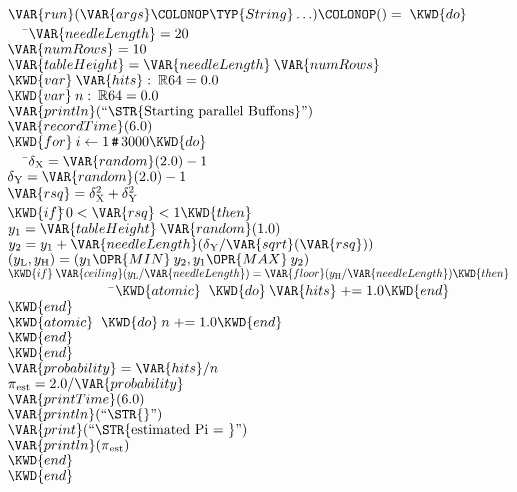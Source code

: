 \documentclass{article}
\begin{document}
\begin{Fortress}
\(\VAR{run}(\VAR{args}\COLONOP\TYP{String}\ldots)\COLONOP()=\;\KWD{do}\)\\
{\tt~~~}\pushtabs\=\+\(   \VAR{needleLength} = 20\)\\
\(   \VAR{numRows} = 10\)\\
\(   \VAR{tableHeight} = \VAR{needleLength}\:\VAR{numRows}\)\\
\(   \KWD{var}\:\VAR{hits} \mathrel{\mathtt{:}}\:\mathbb{R}64 = 0.0\)\\
\(   \KWD{var}\:n \mathrel{\mathtt{:}}\:\mathbb{R}64 = 0.0\)\\[4pt]
\(   \VAR{println}(\hbox{\rm``\STR{Starting~parallel~Buffons}''})\)\\
\(   \VAR{recordTime}(6.0)\)\\
\(   \KWD{for}\:i \leftarrow 1\mathinner{\hbox{\tt\char'43}}3000 \KWD{do}\)\\
{\tt~~~}\pushtabs\=\+\(      \delta{}_{\mathrm{X}} = \VAR{random}(2.0) - 1\)\\
\(      \delta{}_{\mathrm{Y}} = \VAR{random}(2.0) - 1\)\\
\(      \VAR{rsq} = \delta{}_{\mathrm{X}}^{2} + \delta{}_{\mathrm{Y}}^{2}\)\\
\(      \KWD{if}  \null\)\pushtabs\=\+\(0 < \VAR{rsq} < 1 \KWD{then}\)\\
\(         y_{1} = \VAR{tableHeight}\:\VAR{random}(1.0)\)\\
\(         y_{2} = y_{1} + \VAR{needleLength} (\delta{}_{\mathrm{Y}} / \VAR{sqrt}(\VAR{rsq}))\)\\
\(         (y_{\mathrm{L}}, y_{\mathrm{H}}) = (y_{1} \OPR{MIN}\:y_{2}, y_{1} \OPR{MAX}\:y_{2})\)\\
\(         \KWD{if}\:\VAR{ceiling}(y_{\mathrm{L}}/\VAR{needleLength}) = \VAR{floor}(y_{\mathrm{H}}/\VAR{needleLength}) \KWD{then}\)\\
{\tt~~~~~~~~~~~~~~~}\pushtabs\=\+\(                        \KWD{atomic}\;\;\KWD{do}\:\VAR{hits} \mathrel{+}= 1.0 \KWD{end}\)\-\\\poptabs
\(         \KWD{end}\)\\
\(         \KWD{atomic}\;\;\KWD{do}\:n \mathrel{+}= 1.0 \KWD{end}\)\-\\\poptabs
\(      \KWD{end}\)\-\\\poptabs
\(   \KWD{end}\)\\
\(   \VAR{probability} = \VAR{hits}/n\)\\
\(   \pi{}_{\mathrm{est}} = 2.0/\VAR{probability}\)\\
\(   \VAR{printTime}(6.0)\)\\
\(   \VAR{println}(\hbox{\rm``\STR{}''})\)\\
\(   \VAR{print}(\hbox{\rm``\STR{estimated~Pi~=~}''})\)\\
\(   \VAR{println}(\pi{}_{\mathrm{est}})\)\\
\(   \KWD{end}\)\-\\\poptabs
\(\KWD{end}\)
\end{Fortress}
\end{document}
